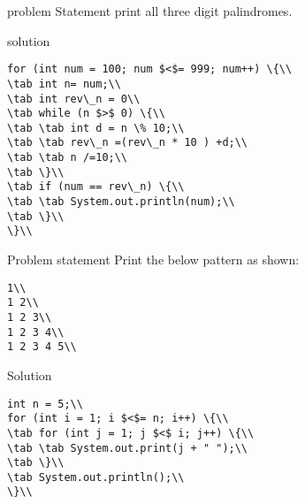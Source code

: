 \documentclass[aspectratio=169,14pt,usenames,dvipsnames]{beamer}
\newcommand\tab[1][1cm]{\hspace*{#1}}
\begin{document}
\begin{frame}{problem Statement}
print all three digit palindromes.
\end{frame}

\begin{frame}{solution}
\begin{lstlisting}
for (int num = 100; num $<$= 999; num++) \{\\
\tab int n= num;\\
\tab int rev\_n = 0\\
\tab while (n $>$ 0) \{\\
\tab \tab int d = n \% 10;\\
\tab \tab rev\_n =(rev\_n * 10 ) +d;\\
\tab \tab n /=10;\\
\tab \}\\
\tab if (num == rev\_n) \{\\
\tab \tab System.out.println(num);\\
\tab \}\\
\}\\
\end{lstlisting}
\end{frame}
\begin{frame}{Problem statement}
Print the below pattern as shown:\\
\begin{lstlisting}
1\\
1 2\\
1 2 3\\
1 2 3 4\\
1 2 3 4 5\\
\end{lstlisting}
\end{frame}

\begin{frame}{Solution}
\begin{lstlisting}
int n = 5;\\
for (int i = 1; i $<$= n; i++) \{\\
\tab for (int j = 1; j $<$ i; j++) \{\\
\tab \tab System.out.print(j + " ");\\
\tab \}\\
\tab System.out.println();\\
\}\\
\end{lstlisting}
\end{frame}
\end{document}
